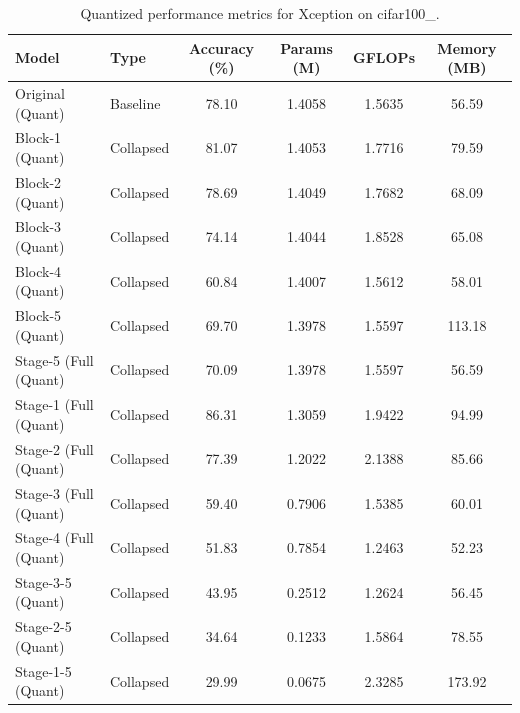 \begin{table}
\caption{Quantized performance metrics for Xception on cifar100_.}
\label{tab:Xception_cifar100__quant}
\begin{tabular}{llcccc}
\toprule
Model & Type & Accuracy (\%) & Params (M) & GFLOPs & Memory (MB) \\
\midrule
Original
(Quant) & Baseline & 78.10 & 1.4058 & 1.5635 & 56.59 \\
Block-1
(Quant) & Collapsed & 81.07 & 1.4053 & 1.7716 & 79.59 \\
Block-2
(Quant) & Collapsed & 78.69 & 1.4049 & 1.7682 & 68.09 \\
Block-3
(Quant) & Collapsed & 74.14 & 1.4044 & 1.8528 & 65.08 \\
Block-4
(Quant) & Collapsed & 60.84 & 1.4007 & 1.5612 & 58.01 \\
Block-5
(Quant) & Collapsed & 69.70 & 1.3978 & 1.5597 & 113.18 \\
Stage-5 (Full
(Quant) & Collapsed & 70.09 & 1.3978 & 1.5597 & 56.59 \\
Stage-1 (Full
(Quant) & Collapsed & 86.31 & 1.3059 & 1.9422 & 94.99 \\
Stage-2 (Full
(Quant) & Collapsed & 77.39 & 1.2022 & 2.1388 & 85.66 \\
Stage-3 (Full
(Quant) & Collapsed & 59.40 & 0.7906 & 1.5385 & 60.01 \\
Stage-4 (Full
(Quant) & Collapsed & 51.83 & 0.7854 & 1.2463 & 52.23 \\
Stage-3-5
(Quant) & Collapsed & 43.95 & 0.2512 & 1.2624 & 56.45 \\
Stage-2-5
(Quant) & Collapsed & 34.64 & 0.1233 & 1.5864 & 78.55 \\
Stage-1-5
(Quant) & Collapsed & 29.99 & 0.0675 & 2.3285 & 173.92 \\
\bottomrule
\end{tabular}
\end{table}
